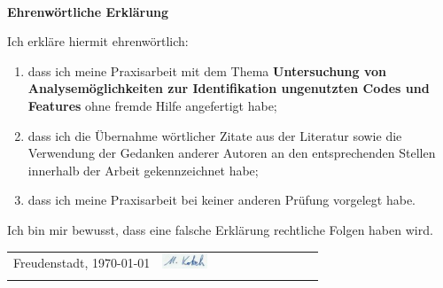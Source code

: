 
~

\vspace{17.1mm}

\begin{flushleft}
    \textbf{\huge{}Ehrenwörtliche Erklärung}{\huge\par}
\par\end{flushleft}

Ich erkläre hiermit ehrenwörtlich:

\begin{enumerate}
    \item dass ich meine Praxisarbeit mit dem Thema \textbf{\glqq Untersuchung von Analysemöglichkeiten zur Identifikation ungenutzten Codes und Features\grqq{}} ohne fremde Hilfe angefertigt habe;
    \item dass ich die Übernahme wörtlicher Zitate aus der Literatur sowie die Verwendung der Gedanken anderer Autoren an den entsprechenden Stellen innerhalb der Arbeit gekennzeichnet habe;
    \item dass ich meine Praxisarbeit bei keiner anderen Prüfung vorgelegt habe.
\end{enumerate}

Ich bin mir bewusst, dass eine falsche Erklärung rechtliche Folgen haben wird.

\vspace{2cm}

\begin{center}
    \begin{tabular*}{\textwidth}{@{\extracolsep{\fill}}cl}
        Freudenstadt, \today & \includegraphics[width=0.3\textwidth]{images/Unterschrift.png}
        \tabularnewline
        & \author{}
        \tabularnewline
    \end{tabular*}
    \par
\end{center}